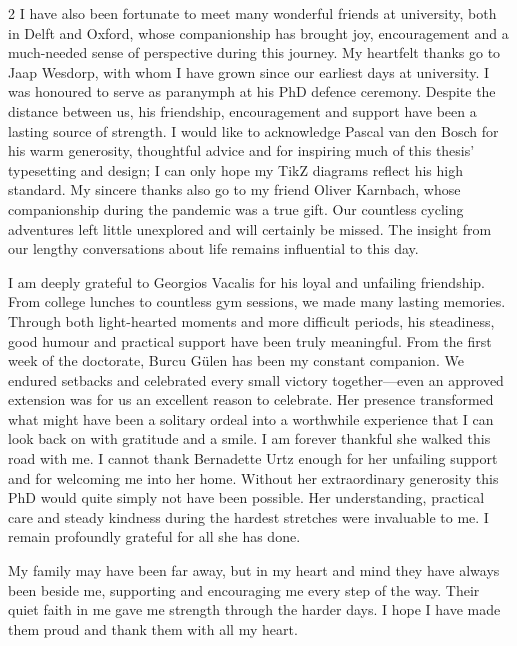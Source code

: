 \documentclass[../Thesis-IJspeert.tex]{subfiles}
\begin{document}
{\begin{spacing}{2}
I have also been fortunate to meet many wonderful friends at university, both in Delft and Oxford, whose companionship has brought joy, encouragement and a much-needed sense of perspective during this journey. My heartfelt thanks go to Jaap Wesdorp, with whom I have grown since our earliest days at university. I was honoured to serve as paranymph at his PhD defence ceremony. Despite the distance between us, his friendship, encouragement and support have been a lasting source of strength. I would like to acknowledge Pascal van den Bosch for his warm generosity, thoughtful advice and for inspiring much of this thesis’ typesetting and design; I can only hope my TikZ diagrams reflect his high standard. My sincere thanks also go to my friend Oliver Karnbach, whose companionship during the pandemic was a true gift. Our countless cycling adventures left little unexplored and will certainly be missed. The insight from our lengthy conversations about life remains influential to this day.

I am deeply grateful to Georgios Vacalis for his loyal and unfailing friendship. From college lunches to countless gym sessions, we made many lasting memories. Through both light-hearted moments and more difficult periods, his steadiness, good humour and practical support have been truly meaningful. From the first week of the doctorate, Burcu Gülen has been my constant companion. We endured setbacks and celebrated every small victory together---even an approved extension was for us an excellent reason to celebrate. Her presence transformed what might have been a solitary ordeal into a worthwhile experience that I can look back on with gratitude and a smile. I am forever thankful she walked this road with me. I cannot thank Bernadette Urtz enough for her unfailing support and for welcoming me into her home. Without her extraordinary generosity this PhD would quite simply not have been possible. Her understanding, practical care and steady kindness during the hardest stretches were invaluable to me. I remain profoundly grateful for all she has done.

My family may have been far away, but in my heart and mind they have always been beside me, supporting and encouraging me every step of the way. Their quiet faith in me gave me strength through the harder days. I hope I have made them proud and thank them with all my heart.
\endgroup
\end{spacing}

}
	
\end{document}
